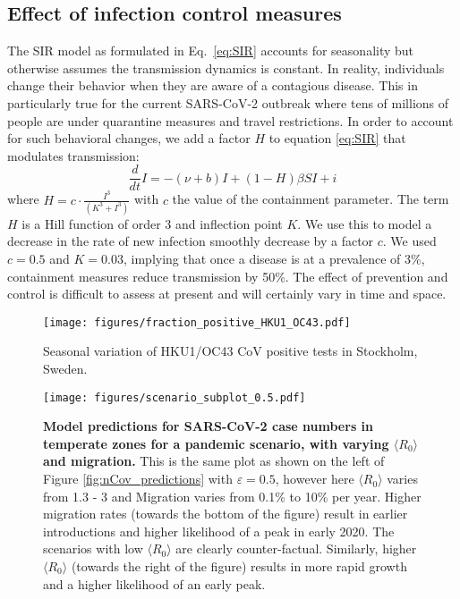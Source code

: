 \documentclass[rmp, reprint, superscriptaddress, floatfix,amsmath]{revtex4-1}
\newcommand{\forcing}{\varepsilon}
\begin{document}
\subsection*{Effect of infection control measures}
The SIR model as formulated in Eq.~\ref{eq:SIR} accounts for seasonality but otherwise assumes the transmission dynamics is constant. 
In reality, individuals change their behavior when they are aware of a contagious disease.
This in particularly true for the current SARS-CoV-2 outbreak where tens of millions of people are under quarantine measures and travel restrictions.
In order to account for such behavioral changes, we add a factor $H$ to equation \ref{eq:SIR} that modulates transmission:
\begin{equation}
\frac{d}{dt} I =  -(\nu+b) I + (1-H)\beta S I + i
\end{equation}
where $H = c\cdot\frac{I^3}{(K^3+I^3)}$ with $c$ the value of the containment parameter. 
The term $H$ is a Hill function of order 3 and inflection point $K$. 
We use this to model a decrease in the rate of new infection smoothly decrease by a factor $c$. 
We used $c=0.5$ and $K=0.03$, implying that once a disease is at a prevalence of 3\%, containment measures reduce transmission by 50\%.
The effect of prevention and control is difficult to assess at present and will certainly vary in time and space. 

\begin{figure}
    \centering
    \texttt{[image: figures/fraction\_positive\_HKU1\_OC43.pdf]}
    \caption{Seasonal variation of HKU1/OC43 CoV positive tests in Stockholm, Sweden. }
    \label{fig:seasonal_variation_supp}
\end{figure}

\begin{figure*}[h]
	\centering
	\texttt{[image: figures/scenario\_subplot\_0.5.pdf]}
	\caption{{\bf Model predictions for SARS-CoV-2 case numbers in temperate zones for a pandemic scenario, with varying $\langle R_0\rangle$ and migration.} This is the same plot as shown on the left of Figure \ref{fig:nCov_predictions} with $\forcing=0.5$, however here $\langle R_0\rangle$ varies from 1.3 - 3 and Migration varies from 0.1\% to 10\% per year. Higher migration rates (towards the bottom of the figure) result in earlier introductions and higher likelihood of a peak in early 2020.
	The scenarios with low $\langle R_0\rangle$ are clearly counter-factual. 
	Similarly, higher $\langle R_0\rangle$ (towards the right of the figure) results in more rapid growth and a higher likelihood of an early peak.}
	\label{fig:scenarios_supp}
\end{figure*}
\end{document}
